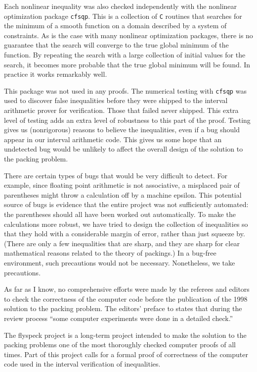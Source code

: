 Each nonlinear inequality was also checked independently with the nonlinear
optimization package {\tt cfsqp}.  This is a collection of {\tt C} routines
that searches for the minimum of a smooth function on a domain described
by a system of constraints.  As is the case with many nonlinear optimization
packages, there is no guarantee that the search will converge to
the true global minimum of the function.   By repeating the search
with a large collection of initial values for the search, it becomes
more probable that the true global minimum will be found.
In practice it works remarkably well.

This package was not used
in any proofs.  The numerical testing with {\tt cfsqp} was used to
discover false inequalities before they were shipped to the interval
arithmetic prover for verification.  Those that failed never shipped.
This extra level of testing adds an extra level of robustness to
this part of the proof.  Testing gives us (nonrigorous)
reasons to believe the inequalities, even if a bug should appear in
our interval arithmetic code.  This gives us some hope that an undetected bug
would be unlikely to affect the overall design of the solution to
the packing problem.


There are certain types of bugs that would be very difficult to detect.
For example, since floating point arithmetic is not associative, a
misplaced pair of parentheses might throw a calculation off by a
machine epsilon.  
This potential source of bugs is evidence that the entire project 
was not sufficiently
automated:  the parentheses should all have been worked out automatically.
To make the calculations more robust, we have tried
to design the collection of inequalities so that they hold with a considerable
margin of error, rather than just squeeze by.  (There are only a few
inequalities that are sharp, and they are sharp for clear mathematical
reasons related to the theory of packings.)  In a bug-free environment,
such precautions would not be necessary.  Nonetheless, we take precautions.

As far as I know, no comprehensive efforts were made by the referees and
editors to check the correctness of the computer code before the
publication of the 1998 solution to the packing problem.  The editors' preface
to \cite{DCG} states that during the review process
``some computer experiments were done in a detailed check.''


The flyspeck project is a long-term project intended to make the solution
to the packing problems one of the most thoroughly checked computer
proofs of all times.  Part of this project calls for a formal proof of correctness of the
computer code used in the interval verification of inequalities.


